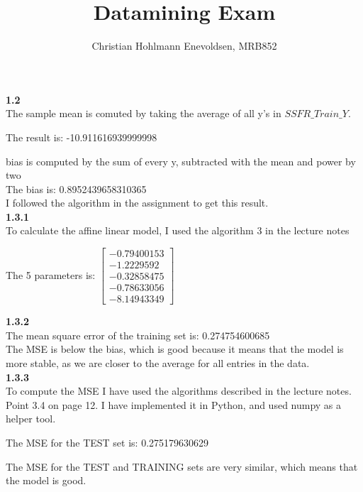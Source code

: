 \documentclass[12pt]{article}
\title{Datamining Exam}
\author{Christian Hohlmann Enevoldsen, MRB852}
\begin{document}
\maketitle

{\setlength{\parindent}{0 cm}

\textbf{1.2}\\

The sample mean is comuted by taking the average of all y's in ${SSFR\_Train\_Y}$.

The result is: -10.911616939999998

bias is computed by the sum of  every y, subtracted with the mean and power by two\\

The bias is: 0.8952439658310365\\

I followed the algorithm in the assignment to get this result. \\

\textbf{1.3.1}\\

To calculate the affine linear model, I used the algorithm 3 in the lecture notes

The 5 parameters is:
$ 
\begin{bmatrix}
-0.79400153\\
 -1.2229592 \\
 -0.32858475\\
 -0.78633056\\
 -8.14943349
\end{bmatrix} 
$

\textbf{1.3.2}\\

The mean square error of the training set is: 0.274754600685\\

The MSE is below the bias, which is good because it means that the model is more stable, as we are closer to the average for all entries in the data.\\

\textbf{1.3.3}\\

To compute the MSE I have used the algorithms described in the lecture notes. Point 3.4 on page 12.
I have implemented it in Python, and used numpy as a helper tool.

The MSE for the TEST set is: 0.275179630629

The MSE for the TEST and TRAINING sets are very similar, which means that the model is good.\\

}
\end{document}
